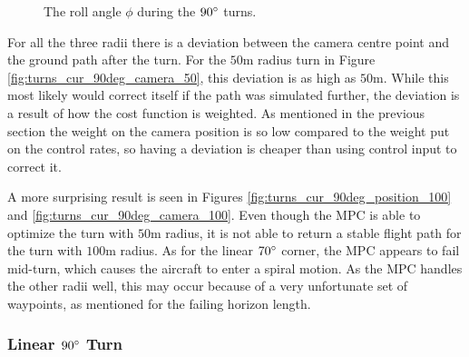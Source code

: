 \begin{figure}[!h]
	\caption{The roll angle $\phi$ during the $90\degree$ turns.}
	\label{fig:turns_cur_90deg_roll}
\end{figure}

For all the three radii there is a deviation between the camera centre point and the ground path after the turn. For the $50$m radius turn in Figure \ref{fig:turns_cur_90deg_camera_50}, this deviation is as high as $50$m. While this most likely would correct itself if the path was simulated further, the deviation is a result of how the cost function is weighted. As mentioned in the previous section the weight on the camera position is so low compared to the weight put on the control rates, so having a deviation is cheaper than using control input to correct it.

A more surprising result is seen in Figures \ref{fig:turns_cur_90deg_position_100} and \ref{fig:turns_cur_90deg_camera_100}. Even though the MPC is able to optimize the turn with $50$m radius, it is not able to return a stable flight path for the turn with $100$m radius. As for the linear $70\degree$ corner, the MPC appears to fail mid-turn, which causes the aircraft to enter a spiral motion. As the MPC handles the other radii well, this may occur because of a very unfortunate set of waypoints, as mentioned for the failing horizon length.

\subsubsection{Linear $90\degree$ Turn}

